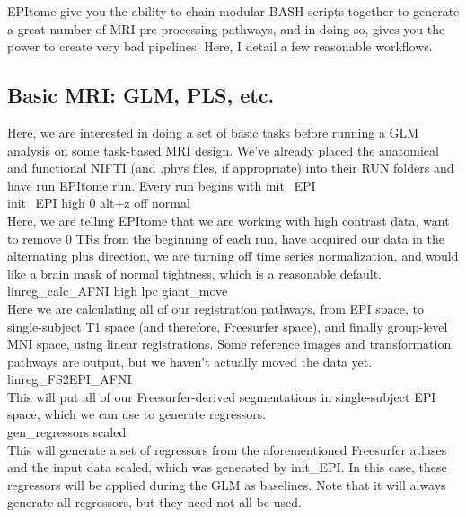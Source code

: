 \documentclass[final,titlepage,letterpaper,oneside,12pt]{article}
\renewcommand{\texttt}[2][BrickRed]{\textcolor{#1}{\ttfamily #2}}%
\begin{document}
EPItome give you the ability to chain modular BASH scripts together to generate a great number of MRI pre-processing pathways, and in doing so, gives you the power to create very bad pipelines. Here, I detail a few reasonable workflows.

\subsection{Basic MRI: GLM, PLS, etc.}

Here, we are interested in doing a set of basic tasks before running a GLM analysis on some task-based MRI design. We've already placed the anatomical and functional NIFTI (and .phys files, if appropriate) into their RUN folders and have run \texttt{EPItome run}. Every run begins with \texttt{init\_EPI} \\

\noindent
\texttt{init\_EPI high 0 alt+z off normal} \\

Here, we are telling EPItome that we are working with high contrast data, want to remove 0 TRs from the beginning of each run, have acquired our data in the alternating plus direction, we are turning off time series normalization, and would like a brain mask of normal tightness, which is a reasonable default. \\

\noindent
\texttt{linreg\_calc\_AFNI high lpc giant\_move} \\

Here we are calculating all of our registration pathways, from EPI space, to single-subject T1 space (and therefore, Freesurfer space), and finally group-level MNI space, using linear registrations. Some reference images and transformation pathways are output, but we haven't actually moved the data yet. \\

\noindent
\texttt{linreg\_FS2EPI\_AFNI} \\

This will put all of our Freesurfer-derived segmentations in single-subject EPI space, which we can use to generate regressors. \\

\noindent
\texttt{gen\_regressors scaled} \\

This will generate a set of regressors from the aforementioned Freesurfer atlases and the input data \texttt{scaled}, which was generated by \texttt{init\_EPI}. In this case, these regressors will be applied during the GLM as baselines. Note that it will always generate all regressors, but they need not all be used. \\
\end{document}
